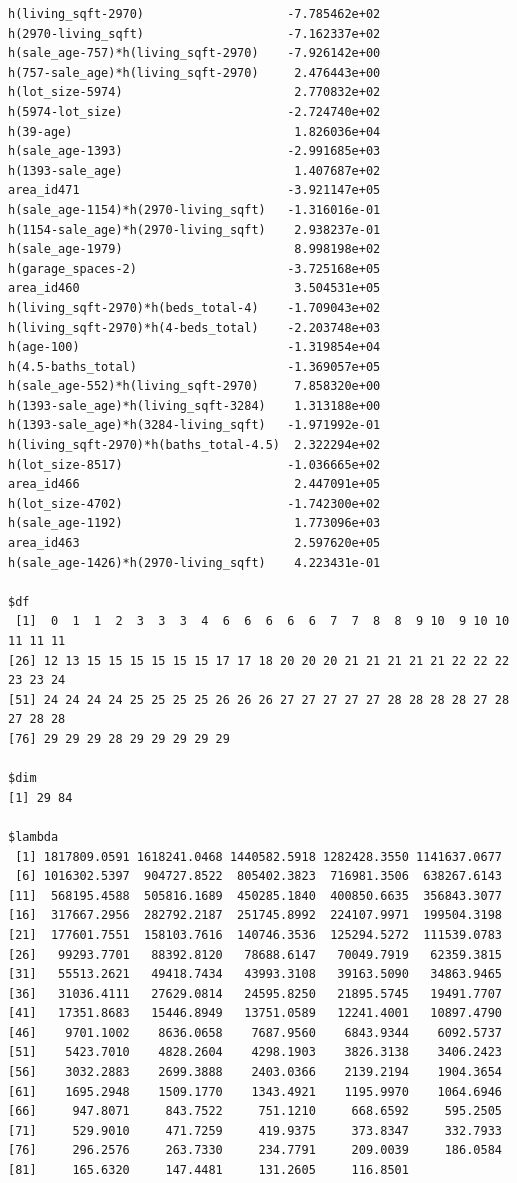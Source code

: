 \documentclass[
]{article}
\begin{document}
\begin{verbatim}
h(living_sqft-2970)                    -7.785462e+02
h(2970-living_sqft)                    -7.162337e+02
h(sale_age-757)*h(living_sqft-2970)    -7.926142e+00
h(757-sale_age)*h(living_sqft-2970)     2.476443e+00
h(lot_size-5974)                        2.770832e+02
h(5974-lot_size)                       -2.724740e+02
h(39-age)                               1.826036e+04
h(sale_age-1393)                       -2.991685e+03
h(1393-sale_age)                        1.407687e+02
area_id471                             -3.921147e+05
h(sale_age-1154)*h(2970-living_sqft)   -1.316016e-01
h(1154-sale_age)*h(2970-living_sqft)    2.938237e-01
h(sale_age-1979)                        8.998198e+02
h(garage_spaces-2)                     -3.725168e+05
area_id460                              3.504531e+05
h(living_sqft-2970)*h(beds_total-4)    -1.709043e+02
h(living_sqft-2970)*h(4-beds_total)    -2.203748e+03
h(age-100)                             -1.319854e+04
h(4.5-baths_total)                     -1.369057e+05
h(sale_age-552)*h(living_sqft-2970)     7.858320e+00
h(1393-sale_age)*h(living_sqft-3284)    1.313188e+00
h(1393-sale_age)*h(3284-living_sqft)   -1.971992e-01
h(living_sqft-2970)*h(baths_total-4.5)  2.322294e+02
h(lot_size-8517)                       -1.036665e+02
area_id466                              2.447091e+05
h(lot_size-4702)                       -1.742300e+02
h(sale_age-1192)                        1.773096e+03
area_id463                              2.597620e+05
h(sale_age-1426)*h(2970-living_sqft)    4.223431e-01

$df
 [1]  0  1  1  2  3  3  3  4  6  6  6  6  6  7  7  8  8  9 10  9 10 10 11 11 11
[26] 12 13 15 15 15 15 15 15 17 17 18 20 20 20 21 21 21 21 21 22 22 22 23 23 24
[51] 24 24 24 24 25 25 25 25 26 26 26 27 27 27 27 27 28 28 28 28 27 28 27 28 28
[76] 29 29 29 28 29 29 29 29 29

$dim
[1] 29 84

$lambda
 [1] 1817809.0591 1618241.0468 1440582.5918 1282428.3550 1141637.0677
 [6] 1016302.5397  904727.8522  805402.3823  716981.3506  638267.6143
[11]  568195.4588  505816.1689  450285.1840  400850.6635  356843.3077
[16]  317667.2956  282792.2187  251745.8992  224107.9971  199504.3198
[21]  177601.7551  158103.7616  140746.3536  125294.5272  111539.0783
[26]   99293.7701   88392.8120   78688.6147   70049.7919   62359.3815
[31]   55513.2621   49418.7434   43993.3108   39163.5090   34863.9465
[36]   31036.4111   27629.0814   24595.8250   21895.5745   19491.7707
[41]   17351.8683   15446.8949   13751.0589   12241.4001   10897.4790
[46]    9701.1002    8636.0658    7687.9560    6843.9344    6092.5737
[51]    5423.7010    4828.2604    4298.1903    3826.3138    3406.2423
[56]    3032.2883    2699.3888    2403.0366    2139.2194    1904.3654
[61]    1695.2948    1509.1770    1343.4921    1195.9970    1064.6946
[66]     947.8071     843.7522     751.1210     668.6592     595.2505
[71]     529.9010     471.7259     419.9375     373.8347     332.7933
[76]     296.2576     263.7330     234.7791     209.0039     186.0584
[81]     165.6320     147.4481     131.2605     116.8501


\end{verbatim}
\end{document}
